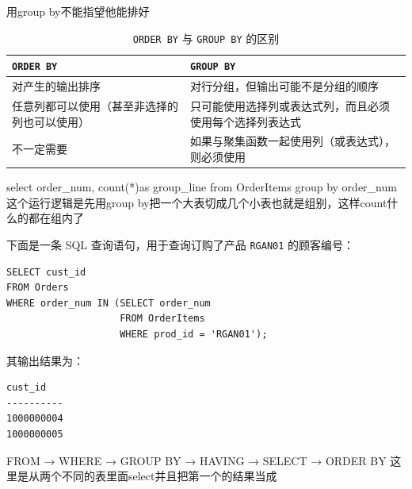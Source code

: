 \begin{dxtips}
    用group by不能指望他能排好
\end{dxtips}
\begin{table}[htbp]
    \centering
    \caption{\texttt{ORDER BY} 与 \texttt{GROUP BY} 的区别}
    \begin{tabular}{p{5.2cm}p{5.2cm}}
        \toprule
        \centering \texttt{ORDER BY} & \centering \texttt{GROUP BY} \tabularnewline
        \midrule
        对产生的输出排序 & 对行分组，但输出可能不是分组的顺序 \\[6pt]
        任意列都可以使用（甚至非选择的列也可以使用） & 只可能使用选择列或表达式列，而且必须使用每个选择列表达式 \\[6pt]
        不一定需要 & 如果与聚集函数一起使用列（或表达式），则必须使用 \\
        \bottomrule
    \end{tabular}
\end{table}
\begin{example}
    select order_num, count(*)as group_line from OrderItems group by order_num
    这个运行逻辑是先用group by把一个大表切成几个小表也就是组别，这样count什么的都在组内了
\end{example}
\begin{example}
下面是一条 SQL 查询语句，用于查询订购了产品 \texttt{RGAN01} 的顾客编号：

\begin{verbatim}
SELECT cust_id
FROM Orders
WHERE order_num IN (SELECT order_num
                    FROM OrderItems
                    WHERE prod_id = 'RGAN01');
\end{verbatim}

其输出结果为：

\begin{verbatim}
cust_id
----------
1000000004
1000000005
\end{verbatim}
\end{example}
\begin{dxtips}
    FROM
→ WHERE
→ GROUP BY
→ HAVING
→ SELECT
→ ORDER BY 这里是从两个不同的表里面select并且把第一个的结果当成
\end{dxtips}

